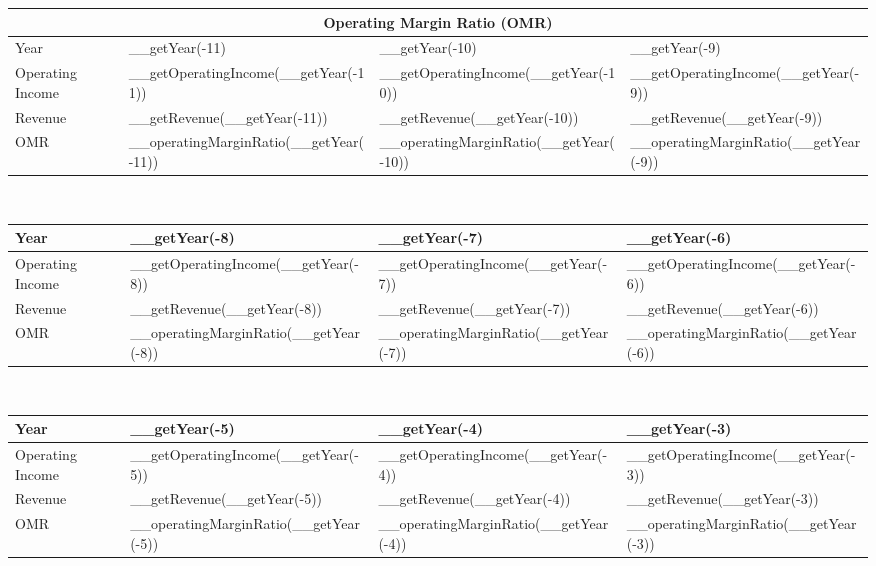 \begin{tabularx}{\textwidth}{|X|X|X|X|}
 \hline
 \multicolumn{4}{|c|}{Operating Margin Ratio (OMR)} \\
 \hline
 Year                      & __getYear(-11)                         & __getYear(-10)                         & __getYear(-9)                         \\
 \hline
 Operating Income          & __getOperatingIncome(__getYear(-11))   & __getOperatingIncome(__getYear(-10))   & __getOperatingIncome(__getYear(-9))   \\
 Revenue                   & __getRevenue(__getYear(-11))           & __getRevenue(__getYear(-10))           & __getRevenue(__getYear(-9))           \\
 \rowcolor{lightgray} OMR  & __operatingMarginRatio(__getYear(-11)) & __operatingMarginRatio(__getYear(-10)) & __operatingMarginRatio(__getYear(-9)) \\
 \hline
\end{tabularx}\\

\begin{tabularx}{\textwidth}{|X|X|X|X|}
 \hline
 Year                      & __getYear(-8)                         & __getYear(-7)                         & __getYear(-6)                         \\
 \hline
 Operating Income          & __getOperatingIncome(__getYear(-8))   & __getOperatingIncome(__getYear(-7))   & __getOperatingIncome(__getYear(-6))   \\
 Revenue                   & __getRevenue(__getYear(-8))           & __getRevenue(__getYear(-7))           & __getRevenue(__getYear(-6))           \\
 \rowcolor{lightgray} OMR  & __operatingMarginRatio(__getYear(-8)) & __operatingMarginRatio(__getYear(-7)) & __operatingMarginRatio(__getYear(-6)) \\
 \hline
\end{tabularx}\\

\begin{tabularx}{\textwidth}{|X|X|X|X|}
 \hline
 Year                      & __getYear(-5)                         & __getYear(-4)                         & __getYear(-3)                         \\
 \hline
 Operating Income          & __getOperatingIncome(__getYear(-5))   & __getOperatingIncome(__getYear(-4))   & __getOperatingIncome(__getYear(-3))   \\
 Revenue                   & __getRevenue(__getYear(-5))           & __getRevenue(__getYear(-4))           & __getRevenue(__getYear(-3))           \\
 \rowcolor{lightgray} OMR  & __operatingMarginRatio(__getYear(-5)) & __operatingMarginRatio(__getYear(-4)) & __operatingMarginRatio(__getYear(-3)) \\
 \hline
\end{tabularx}\\


